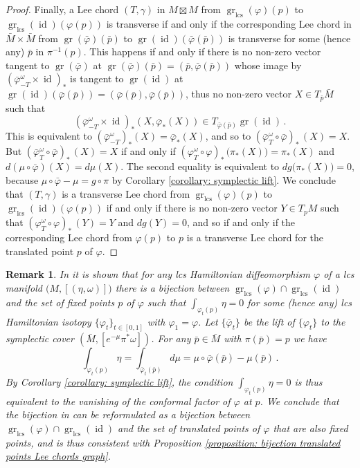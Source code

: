 \documentclass{amsart}
\DeclareMathOperator{\gr}{gr}
\DeclareMathOperator{\lcs}{lcs}
\DeclareMathOperator{\id}{id}
\newtheorem{remark}[thm]{Remark}
\theoremstyle{remark}
\begin{document}
\begin{proof}
Finally,
a Lee chord $(T,\gamma)$ in $M \boxtimes M$
from $\gr_{\lcs} (\varphi)(p)$ to $\gr_{\lcs} (\id) (\varphi(p))$ is transverse
if and only if the  corresponding Lee chord in $\bar{M} \times \bar{M}$
from $\gr (\bar{\varphi}) (\bar{p})$ to $\gr (\id) (\bar{\varphi} (\bar{p}))$
is transverse for some (hence any) $\bar{p}$ in $\pi^{-1}(p)$. 
This happens if and only if there is no non-zero vector
tangent to $\gr (\bar{\varphi})$
at $\gr (\bar{\varphi})(\bar{p}) = (\bar{p}, \bar{\varphi}(\bar{p}))$
whose image by $(\bar{\varphi}^\omega_{-T} \times \id)_{\ast}$
is tangent to $\gr (\id)$
at $\gr (\id)(\bar{\varphi}(\bar{p})) = (\bar{\varphi}(\bar{p}), \bar{\varphi}(\bar{p}))$,
thus no non-zero vector $X \in T_{\bar{p}}\bar{M}$ such that
$$
(\bar{\varphi}^\omega_{-T} \times \id)_* (X, \bar{\varphi}_* (X))
\in T_{\bar{\varphi}(\bar{p})}\gr(\id) \,.
$$
This is equivalent to
$(\bar{\varphi}^\omega_{-T})_* (X) =  \bar{\varphi}_* (X)$,
and so to $( \bar{\varphi}_T^{\omega} \circ \bar{\varphi})_{\ast} \, (X) = X$.
But $(\bar{\varphi}_T^{\omega} \circ \bar{\varphi})_{\ast} \, (X) = X$
if and only if
$(\varphi_T^{\omega} \circ \varphi)_{\ast} \, \big(\pi_{\ast}(X)\big) = \pi_{\ast} (X)$
and $d (\mu \circ \bar{\varphi}) (X) = d\mu (X)$.
The second equality is equivalent
to $dg \big(\pi_{\ast} (X)\big) = 0$,
because $\mu \circ \bar{\varphi} - \mu = g \circ \pi$
by Corollary \ref{corollary: symplectic lift}.
We conclude that $(T,\gamma)$ is a transverse Lee chord
from $\gr_{\lcs} (\varphi)(p)$ to $\gr_{\lcs} (\id)(\varphi(p))$
if and only if there is no non-zero vector $Y \in T_pM$
such that $(\varphi_T^{\omega} \circ \varphi)_{\ast} \, (Y) = Y$
and $dg (Y) = 0$,
and so if and only if the corresponding Lee chord from $\varphi (p)$ to $p$
is a transverse Lee chord for the translated point $p$ of $\varphi$.
\end{proof}

\begin{remark}\label{remark: cf bijection CS}
In \cite[Theorem 1.5 (3)]{CS} it is shown that
for any lcs Hamiltonian diffeomorphism $\varphi$
of a lcs manifold $\big(M, [(\eta, \omega)]\big)$
there is a bijection between
$\gr_{\lcs} (\varphi) \cap \gr_{\lcs} (\id)$
and the set of fixed points $p$ of $\varphi$
such that $\int_{\varphi_t(p)} \eta = 0$
for some (hence any) lcs Hamiltonian isotopy
$\{\varphi_t\}_{t \in [0, 1]}$ with $\varphi_1 = \varphi$.
Let $\{\bar{\varphi}_t\}$ be the lift of $\{\varphi_t\}$
to the symplectic cover $(\bar{M}, [e^{-\mu} \pi^{\ast}\omega] )$.
For any $\bar{p} \in \bar{M}$ with $\pi (\bar{p}) = p$
we have
$$
\int_{\varphi_t(p)} \eta
= \int_{\bar{\varphi}_t(\bar{p})} d\mu 
= \mu \circ \bar{\varphi} (\bar{p}) - \mu (\bar{p}) \,.
$$
By Corollary \ref{corollary: symplectic lift},
the condition $\int_{\varphi_t(p)} \eta = 0$
is thus equivalent to the vanishing
of the conformal factor of $\varphi$ at $p$.
We conclude that the bijection in \cite[Theorem 1.5 (3)]{CS}
can be reformulated
as a bijection between
$\gr_{\lcs} (\varphi) \cap \gr_{\lcs} (\id)$
and the set of translated points of $\varphi$
that are also fixed points,
and is thus consistent with
Proposition \ref{proposition: bijection translated points Lee chords graph}.
\end{remark}
\end{document}
